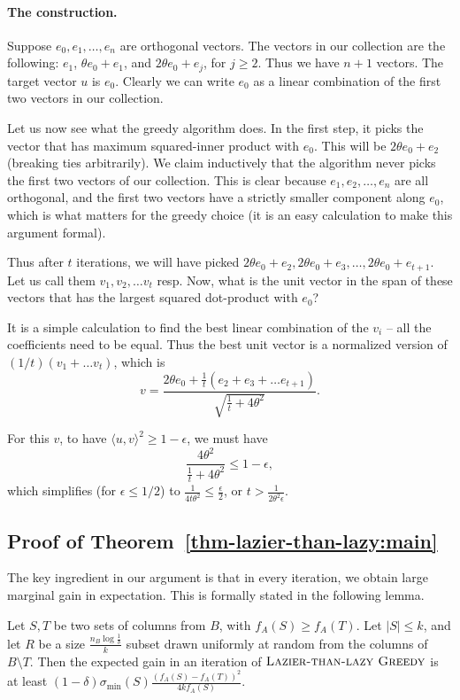 \documentclass{article}
\newcommand{\ltlgreedy}{\textsc{Lazier-than-lazy Greedy}}
\newcommand{\iprod}[1]{\langle #1 \rangle}
\begin{document}
\paragraph{The construction.} 
Suppose $e_0, e_1, \dots, e_n$ are orthogonal vectors.  The vectors in
our collection are the following: $e_1$, $\theta e_0 +e_1$, and
$2\theta e_0 + e_j$, for $j \ge 2$. Thus we have $n+1$ vectors. The
target vector $u$ is $e_0$.  Clearly we can write $e_0$ as a linear
combination of the first two vectors in our collection.

Let us now see what the greedy algorithm does. In the first step, it
picks the vector that has maximum squared-inner product with $e_0$.
This will be $2\theta e_0 + e_2$ (breaking ties arbitrarily). We claim
inductively that the algorithm never picks the first two vectors of
our collection. This is clear because $e_1, e_2, \dots, e_n$ are all
orthogonal, and the first two vectors have a strictly smaller
component along $e_0$, which is what matters for the greedy choice (it
is an easy calculation to make this argument formal).

Thus after $t$ iterations, we will have picked $2\theta e_0 + e_2,
2\theta e_0 + e_3, \dots, 2\theta e_0 + e_{t+1}$.  Let us call them
$v_1, v_2, \dots v_t$ resp. Now, what is the unit vector in the span
of these vectors that has the largest squared dot-product with $e_0$?

It is a simple calculation to find the best linear combination of the
$v_i$ -- all the coefficients need to be equal. Thus the best unit
vector is a normalized version of $(1/t) (v_1 + \dots v_t)$, which is
\[ v = \frac{ 2\theta e_0 + \frac{1}{t}(e_2 + e_3 +\dots e_{t+1})}{\sqrt{\frac{1}{t} + 4\theta^2}}. \]

For this $v$, to have $\iprod{u, v}^2 \ge 1-\epsilon$, we must have 
\[\frac{4\theta^2}{\frac{1}{t} + 4\theta^2} \le 1- \epsilon,  \]
which simplifies (for $\epsilon \le 1/2$) to $\frac{1}{4 t\theta^2} \le \frac{\epsilon}{2}$, or $t > \frac{1}{2\theta^2\epsilon}$.


\subsection{Proof of Theorem~\ref{thm-lazier-than-lazy:main}} \label{app:thm-lazier-than-lazy}
The key ingredient in our argument is that in every iteration, we obtain large marginal gain in expectation. This is formally stated in the following lemma.

\begin{lemma} \label{lem:large-gain-lazier-than-lazy}
Let $S, T$ be two sets of columns from $B$, with $f_A(S) \geq f_A(T)$. Let $|S| \leq k$, and let $R$ be a size $\frac{n_B \log \frac{1}{\delta}}{k}$ subset drawn uniformly at random from the columns of $B \setminus T$.  Then the expected gain in an iteration of $\ltlgreedy$ is at least $(1 - \delta) \sigma_{\min}(S) \frac{(f_A(S) - f_A(T))^2}{4kf_A(S)}$.
\end{lemma}
\end{document}
